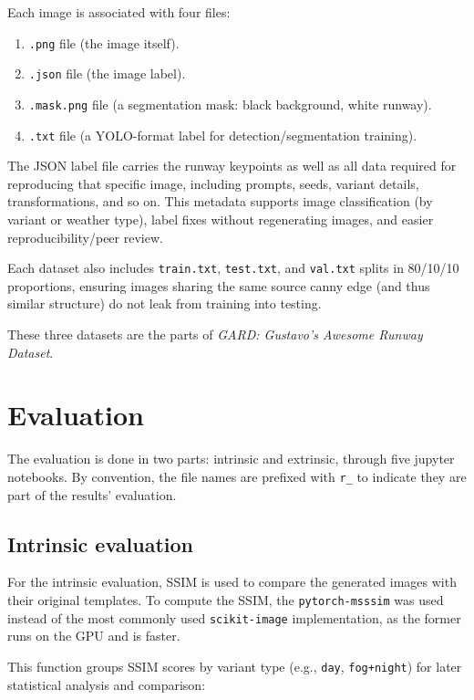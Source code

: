 Each image is associated with four files:
\begin{enumerate}
\item \texttt{.png} file (the image itself).
\item \texttt{.json} file (the image label).
\item \texttt{.mask.png} file (a segmentation mask: black background, white runway).
\item \texttt{.txt} file (a YOLO-format label for detection/segmentation training).
\end{enumerate}

The JSON label file carries the runway keypoints as well as all data required for reproducing that specific image, including prompts, seeds, variant details, transformations, and so on. 
This metadata supports image classification (by variant or weather type), label fixes without regenerating images, and easier reproducibility/peer review.

Each dataset also includes \texttt{train.txt}, \texttt{test.txt}, and \texttt{val.txt} splits in 80/10/10 proportions, ensuring images sharing the same source canny edge (and thus similar structure) do not leak from training into testing.

These three datasets are the parts of \emph{GARD: Gustavo’s Awesome Runway Dataset}.

\section{Evaluation}

The evaluation is done in two parts: intrinsic and extrinsic, through five
jupyter notebooks. By convention, the file names are prefixed with \texttt{r\_} to
indicate they are part of the results' evaluation.

\subsection{Intrinsic evaluation}

For the intrinsic evaluation, \ac{SSIM} is used to compare the generated images
with their original templates. To compute the SSIM, the \texttt{pytorch-msssim}
\cite{pessoa_jorge-pessoapytorch-msssim_2025}
was used instead of the most commonly used \texttt{scikit-image}
\cite{van_der_walt_scikit-image_2014}
implementation,
as the former runs on the GPU and is faster.

This function groups SSIM scores by variant type (e.g., \texttt{day},
\texttt{fog+night}) for later statistical analysis and comparison:

